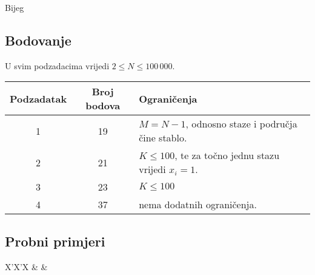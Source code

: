 \begin{statement}[
  problempoints=100,
  timelimit=1 sekunda,
  memorylimit=512 MiB,
]{Bijeg}
\subsection*{Bodovanje}

U svim podzadacima vrijedi $2 \le N \le 100\,000$.

{\renewcommand{\arraystretch}{1.4}
  \setlength{\tabcolsep}{6pt}
  \begin{tabular}{ccl}
   Podzadatak & Broj bodova & Ograničenja \\ \midrule
    1 & 19 & $M = N - 1$, odnosno staze i područja čine stablo. \\
    2 & 21 & $K \le 100$, te za točno jednu stazu vrijedi $x_i = 1$. \\
    3 & 23 & $K \le 100$ \\
    4 & 37 & nema dodatnih ograničenja.
\end{tabular}}

\subsection*{Probni primjeri}
\begin{tabularx}{\textwidth}{X'X'X}
 &
 &
\end{tabularx}

\end{statement}

